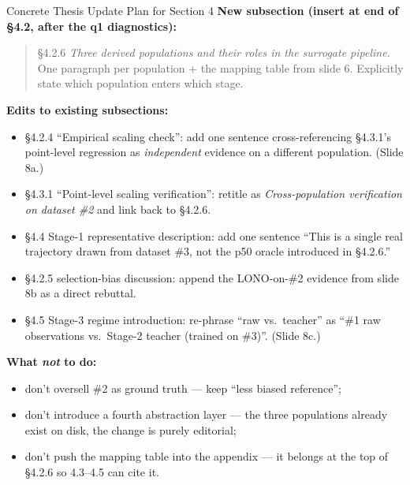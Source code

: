 \documentclass[UTF8,aspectratio=169]{ctexbeamer}
\begin{document}
\begin{frame}{Concrete Thesis Update Plan for Section 4}
\small
\textbf{New subsection (insert at end of \S 4.2, after the q1 diagnostics):}
\begin{quote}\small
\S 4.2.6 \emph{Three derived populations and their roles in the surrogate pipeline.}\\
One paragraph per population + the mapping table from slide 6. Explicitly state which population enters which stage.
\end{quote}

\vspace{0.35em}
\textbf{Edits to existing subsections:}
\begin{itemize}\setlength\itemsep{2pt}
  \item \S 4.2.4 ``Empirical scaling check'': add one sentence cross-referencing \S 4.3.1's point-level regression as \emph{independent} evidence on a different population. (Slide 8a.)
  \item \S 4.3.1 ``Point-level scaling verification'': retitle as \emph{Cross-population verification on dataset \#2} and link back to \S 4.2.6.
  \item \S 4.4 Stage-1 representative description: add one sentence ``This is a single real trajectory drawn from dataset \#3, not the p50 oracle introduced in \S 4.2.6.''
  \item \S 4.2.5 selection-bias discussion: append the LONO-on-\#2 evidence from slide 8b as a direct rebuttal.
  \item \S 4.5 Stage-3 regime introduction: re-phrase ``raw vs.\ teacher'' as ``\#1 raw observations vs.\ Stage-2 teacher (trained on \#3)''. (Slide 8c.)
\end{itemize}

\vspace{0.4em}
\textbf{What \emph{not} to do:}
\begin{itemize}\setlength\itemsep{2pt}
  \item don't oversell \#2 as ground truth --- keep ``less biased reference'';
  \item don't introduce a fourth abstraction layer --- the three populations already exist on disk, the change is purely editorial;
  \item don't push the mapping table into the appendix --- it belongs at the top of \S 4.2.6 so 4.3--4.5 can cite it.
\end{itemize}
\end{frame}
\end{document}

